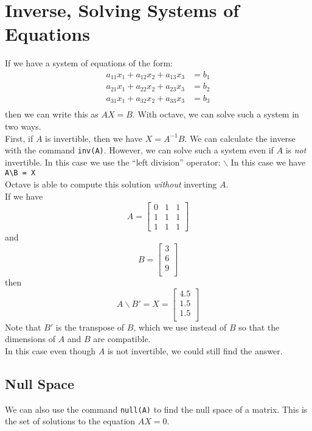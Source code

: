 \documentclass{article}
\begin{document}
\section{Inverse, Solving Systems of Equations}
If we have a system of equations of the form:
\begin{align*}
a_{11}x_1+a_{12}x_2 + a_{13}x_3 &= b_1 \\
a_{21}x_1+a_{22}x_2 + a_{23}x_3 &= b_2 \\
a_{31}x_1+a_{32}x_2 + a_{33}x_3 &= b_3 \\
\end{align*}
then we can write this as $AX = B$.  With octave, we can solve such a system in two ways.
\\First, if $A$ is invertible, then we have $X=A^{-1}B$.  We can calculate the inverse with the command \verb|inv(A)|.  However, we can solve such a system even if $A$ is \emph{not} invertible.  In this case we use the ``left division'' operator: $\backslash$  In this case we have \verb|A\B = X|  
\\Octave is able to compute this solution \emph{without} inverting $A$.\\
If we have
\[A =
\left[
\begin{array}{ccc}
0 & 1 & 1\\
1 & 1 & 1 \\
1 & 1 & 1
 \end{array}
 \right]
\]
and
\[B =
\left[
\begin{array}{c}
3\\
6\\ 
9\\ 
 \end{array}
 \right]
\]
then 
\[A\backslash B'= X =
\left[
\begin{array}{c}
4.5\\ 
1.5\\ 
1.5\\ 
 \end{array}
 \right]
\]
Note that $B'$ is the transpose of $B$, which we use instead of $B$ so that the dimensions of $A$ and $B$ are compatible. 
\\In this case even though $A$ is not invertible, we could still find the answer.
\subsection{Null Space}
We can also use the command \verb|null(A)| to find the null space of a matrix.  This is the set of solutions to the equation $AX = 0$.
\end{document}
